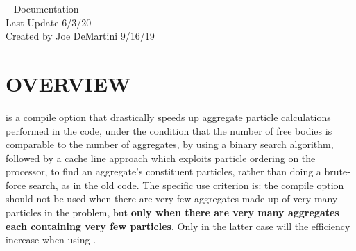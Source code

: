 



\begin{flushleft}

\huge{\pkd\  Documentation}\\
\bigskip\bigskip
\Large{Last Update 6/3/20}\\
\bigskip\bigskip
\large{Created by Joe DeMartini 9/16/19}\\

\end{flushleft}

\section{OVERVIEW}

 is a  compile option that drastically speeds up aggregate 
particle calculations performed in the code, under the condition that the number of free 
bodies is comparable to the number of aggregates, by using a binary search algorithm, 
followed by a cache line approach which exploits particle ordering on the processor, to find 
an aggregate's constituent particles, rather than doing a brute-force search, as in the old 
code. The specific use criterion is: the  compile option should not be used 
when there are very few aggregates made up of very many particles in the problem, but 
\textbf{only when there are very many aggregates each containing very few particles}. Only in 
the latter case will the efficiency increase when using .\\

\medskip

